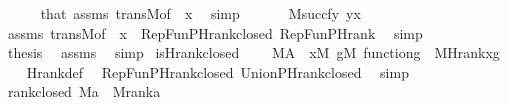 \begin{isabellebody}
\ \ \ \ \isamarkupfalse%
\ that\ assms\ transM{\isacharbrackleft}{\kern0pt}of\ {\isacharunderscore}{\kern0pt}\ x{\isacharbrackright}{\kern0pt}\ \isamarkupfalse%
\ simp\isanewline
\ \ \isamarkupfalse%
\isanewline
\ \ \isamarkupfalse%
\ {\isachardoublequoteopen}M{\isacharparenleft}{\kern0pt}{\isacharbraceleft}{\kern0pt}succ{\isacharparenleft}{\kern0pt}f{\isacharbackquote}{\kern0pt}y{\isacharparenright}{\kern0pt}{\isachardot}{\kern0pt}\ y{\isasymin}x{\isacharbraceright}{\kern0pt}{\isacharparenright}{\kern0pt}{\isachardoublequoteclose}\isanewline
\ \ \ \ \isamarkupfalse%
\ assms\ transM{\isacharbrackleft}{\kern0pt}of\ {\isacharunderscore}{\kern0pt}\ x{\isacharbrackright}{\kern0pt}\ \ RepFun{\isacharunderscore}{\kern0pt}PHrank{\isacharunderscore}{\kern0pt}closed\ RepFun{\isacharunderscore}{\kern0pt}PHrank\ \isamarkupfalse%
\ simp\isanewline
\ \ \isamarkupfalse%
\ \isamarkupfalse%
\ {\isacharquery}{\kern0pt}thesis\ \isamarkupfalse%
\ assms\ \isamarkupfalse%
\ simp\isanewline
{}\isamarkupfalse%
%
\endisatagproof
{\isafoldproof}%
%
\isadelimproof
\isanewline
%
\endisadelimproof
\isanewline
{}\isamarkupfalse%
\ is{\isacharunderscore}{\kern0pt}Hrank{\isacharunderscore}{\kern0pt}closed\ {\isacharcolon}{\kern0pt}\ \isanewline
\ \ {\isachardoublequoteopen}M{\isacharparenleft}{\kern0pt}A{\isacharparenright}{\kern0pt}\ {\isasymLongrightarrow}\ {\isasymforall}x{\isacharbrackleft}{\kern0pt}M{\isacharbrackright}{\kern0pt}{\isachardot}{\kern0pt}\ {\isasymforall}g{\isacharbrackleft}{\kern0pt}M{\isacharbrackright}{\kern0pt}{\isachardot}{\kern0pt}\ function{\isacharparenleft}{\kern0pt}g{\isacharparenright}{\kern0pt}\ {\isasymlongrightarrow}\ M{\isacharparenleft}{\kern0pt}Hrank{\isacharparenleft}{\kern0pt}x{\isacharcomma}{\kern0pt}g{\isacharparenright}{\kern0pt}{\isacharparenright}{\kern0pt}{\isachardoublequoteclose}\isanewline
%
\isadelimproof
\ \ %
\endisadelimproof
%
\isatagproof
{}\isamarkupfalse%
\ Hrank{\isacharunderscore}{\kern0pt}def\ \isamarkupfalse%
\ RepFun{\isacharunderscore}{\kern0pt}PHrank{\isacharunderscore}{\kern0pt}closed\ Union{\isacharunderscore}{\kern0pt}PHrank{\isacharunderscore}{\kern0pt}closed\ \isamarkupfalse%
\ simp%
\endisatagproof
{\isafoldproof}%
%
\isadelimproof
\isanewline
%
\endisadelimproof
\isanewline
{}\isamarkupfalse%
\ rank{\isacharunderscore}{\kern0pt}closed{\isacharcolon}{\kern0pt}\ {\isachardoublequoteopen}M{\isacharparenleft}{\kern0pt}a{\isacharparenright}{\kern0pt}\ {\isasymLongrightarrow}\ M{\isacharparenleft}{\kern0pt}rank{\isacharparenleft}{\kern0pt}a{\isacharparenright}{\kern0pt}{\isacharparenright}{\kern0pt}{\isachardoublequoteclose}\isanewline

\end{isabellebody}
